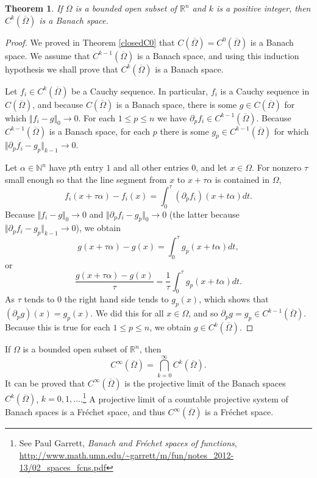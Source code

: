 \documentclass{article}
\newcommand{\norm}[1]{\Vert #1 \Vert}
\newtheorem{theorem}{Theorem}
\begin{document}
\begin{theorem}
If $\Omega$ is a bounded open subset of $\mathbb{R}^n$ and $k$ is a positive integer, then
$C^k(\overline{\Omega})$ is a Banach space.
\end{theorem}
\begin{proof}
We proved in Theorem \ref{closedC0} that $C(\overline{\Omega})=C^0(\overline{\Omega})$ is a Banach space. We assume
that $C^{k-1}(\overline{\Omega})$ is a Banach space, and using this induction hypothesis we shall prove that $C^k(\overline{\Omega})$
is a Banach space.

Let $f_i \in C^k(\overline{\Omega})$ be a Cauchy sequence. In particular, 
$f_i$ is a Cauchy sequence in $C(\overline{\Omega})$, and because $C(\overline{\Omega})$ is a Banach space,
 there is some $g \in C(\overline{\Omega})$ for which
$\norm{f_i - g}_0 \to 0$.
For each $1 \leq p \leq n$ we have $\partial_p f_i \in C^{k-1}(\overline{\Omega})$. 
Because $C^{k-1}(\overline{\Omega})$ is a Banach space, for each $p$ there is some $g_p \in C^{k-1}(\overline{\Omega})$ for which
$\norm{\partial_p f_i - g_p}_{k-1} \to 0$.

Let $\alpha \in \mathbb{N}^n$ have $p$th entry $1$ and all other entries $0$, and let  $x \in \Omega$.
For nonzero $\tau$ small enough so that the line segment from $x$ to $x+\tau \alpha$ is contained in $\Omega$, 
\[
f_i(x+\tau \alpha)-f_i(x)=\int_0^\tau (\partial_p f_i)(x+t\alpha)dt.
\]
Because $\norm{f_i-g}_0 \to 0$ and $\norm{\partial_p f_i - g_p}_0 \to 0$ (the latter because $\norm{\partial_p f_i-g_p}_{k-1} \to 0$), we obtain
\[
g(x+\tau \alpha)-g(x) = \int_0^\tau g_p(x+t\alpha)dt,
\]
or
\[
\frac{g(x+\tau\alpha)-g(x)}{\tau} = \frac{1}{\tau} \int_0^\tau g_p(x+t\alpha)dt.
\]
As $\tau$ tends to $0$ the right hand side tends to $g_p(x)$, which shows that $(\partial_p g)(x)=g_p(x)$. We did this for all $x \in \Omega$,
and so $\partial_p g =g_p \in C^{k-1}(\overline{\Omega})$.
Because this is true for each $1 \leq p \leq n$, we obtain $g \in C^k(\overline{\Omega})$.
\end{proof}

If $\Omega$ is a bounded open subset of $\mathbb{R}^n$, then 
\[
C^\infty(\overline{\Omega}) = \bigcap_{k=0}^\infty C^k(\overline{\Omega}).
\]
It can be proved that $C^\infty(\overline{\Omega})$ is the projective limit of the Banach spaces $C^k(\overline{\Omega})$, $k=0,1,\ldots$.\footnote{See Paul Garrett, {\em Banach and Fr\'echet spaces of functions},  \url{http://www.math.umn.edu/~garrett/m/fun/notes_2012-13/02_spaces_fcns.pdf}} A projective limit of a countable projective system of Banach spaces is a Fr\'echet
space, and thus $C^\infty(\overline{\Omega})$ is a Fr\'echet space. 
\end{document}
